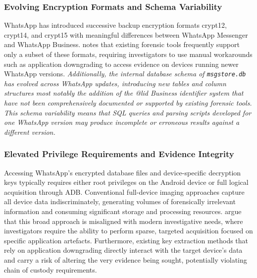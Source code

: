 \documentclass[12pt,a4paper]{report}
\begin{document}
\subsubsection{Evolving Encryption Formats and Schema Variability}

WhatsApp has introduced successive backup encryption formats crypt12, crypt14, and crypt15 with meaningful differences between WhatsApp Messenger and WhatsApp Business. \citet{nishchal2024} notes that existing forensic tools frequently support only a subset of these formats, requiring investigators to use manual workarounds such as application downgrading to access evidence on devices running newer WhatsApp versions. \emph{Additionally, the internal database schema of \texttt{msgstore.db} has evolved across WhatsApp updates, introducing new tables and column structures most notably the addition of the @lid Business identifier system that have not been comprehensively documented or supported by existing forensic tools. This schema variability means that SQL queries and parsing scripts developed for one WhatsApp version may produce incomplete or erroneous results against a different version.}

\subsubsection{Elevated Privilege Requirements and Evidence Integrity}

Accessing WhatsApp's encrypted database files and device-specific decryption keys typically requires either root privileges on the Android device or full logical acquisition through ADB. Conventional full-device imaging approaches capture all device data indiscriminately, generating volumes of forensically irrelevant information and consuming significant storage and processing resources. \citet{aggarwal2019} argue that this broad approach is misaligned with modern investigative needs, where investigators require the ability to perform sparse, targeted acquisition focused on specific application artefacts. Furthermore, existing key extraction methods that rely on application downgrading directly interact with the target device's data and carry a risk of altering the very evidence being sought, potentially violating chain of custody requirements.

\end{document}
